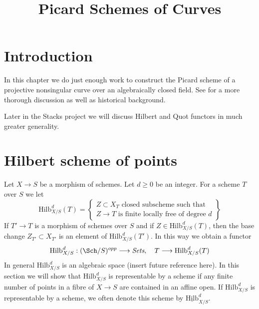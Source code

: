 

%


\title{Picard Schemes of Curves}


\maketitle

\label{section-phantom}

\tableofcontents


\section{Introduction}
\label{section-introduction}

\noindent
In this chapter we do just enough work to construct the Picard scheme
of a projective nonsingular curve over an algebraically closed field.
See \cite{Kleiman-Picard} for a more thorough discussion as well as
historical background.

\medskip\noindent
Later in the Stacks project we will discuss Hilbert and Quot functors
in much greater generality.


\section{Hilbert scheme of points}
\label{section-hilbert-scheme-points}

\noindent
Let $X \to S$ be a morphism of schemes. Let $d \geq 0$ be an integer.
For a scheme $T$ over $S$ we let
$$
\text{Hilb}^d_{X/S}(T) =
\left\{
\begin{matrix}
Z \subset X_T\text{ closed subscheme such that }\\
Z \to T\text{ is finite locally free of degree }d
\end{matrix}
\right\}
$$
If $T' \to T$ is a morphism of schemes over $S$ and if
$Z \in \text{Hilb}^d_{X/S}(T)$, then the base change
$Z_{T'} \subset X_{T'}$ is an element of $\text{Hilb}^d_{X/S}(T')$.
In this way we obtain a functor
$$
\text{Hilb}^d_{X/S} :
(\Sch/S)^{opp} \longrightarrow \textit{Sets},\quad
T \longrightarrow \text{Hilb}^d_{X/S}(T)
$$
In general $\text{Hilb}^d_{X/S}$ is an algebraic space
(insert future reference here). In this section we will
show that $\text{Hilb}^d_{X/S}$ is representable
by a scheme if any finite number of points in a fibre of
$X \to S$ are contained in an affine open.
If $\text{Hilb}^d_{X/S}$ is representable by a scheme, we often
denote this scheme by $\underline{\text{Hilb}}^d_{X/S}$.

